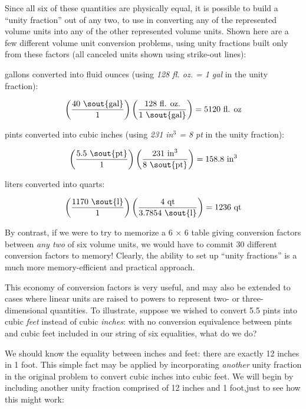 \vskip 10pt

Since all six of these quantities are physically equal, it is possible to build a ``unity fraction'' out of any two, to use in converting any of the represented volume units into any of the other represented volume units.  Shown here are a few different volume unit conversion problems, using unity fractions built only from these factors (all canceled units shown using strike-out lines):

\vskip 10pt

 gallons converted into fluid ounces (using \textit{128 fl. oz. = 1 gal} in the unity fraction):

$$\left({40 \hbox{ \sout{gal}} \over 1}\right) \left({128 \hbox{ fl. oz.} \over 1 \hbox{ \sout{gal}}}\right) = 5120 \hbox{ fl. oz}$$

\vskip 10pt

 pints converted into cubic inches (using \textit{231 in$^{3}$ = 8 pt} in the unity fraction):

$$\left({5.5 \hbox{ \sout{pt}} \over 1}\right) \left({231 \hbox{ in}^3 \over 8 \hbox{ \sout{pt}}}\right) = 158.8 \hbox{ in}^3$$

\vskip 10pt

 liters converted into quarts:

$$\left({1170 \hbox{ \sout{l}} \over 1}\right) \left({4 \hbox{ qt} \over 3.7854 \hbox{ \sout{l}}}\right) = 1236 \hbox{ qt}$$

\vskip 10pt

By contrast, if we were to try to memorize a 6 $\times$ 6 table giving conversion factors between \textit{any two} of six volume units, we would have to commit 30 different conversion factors to memory!  Clearly, the ability to set up ``unity fractions'' is a much more memory-efficient and practical approach.

\vskip 10pt

This economy of conversion factors is very useful, and may also be extended to cases where linear units are raised to powers to represent two- or three-dimensional quantities.  To illustrate, suppose we wished to convert 5.5 pints into cubic \textit{feet} instead of cubic \textit{inches}: with no conversion equivalence between pints and cubic feet included in our string of six equalities, what do we do?

We should know the equality between inches and feet: there are exactly 12 inches in 1 foot.  This simple fact may be applied by incorporating \textit{another} unity fraction in the original problem to convert cubic inches into cubic feet.  We will begin by including another unity fraction comprised of 12 inches and 1 foot,just to see how this might work:


